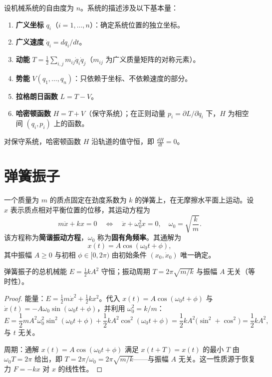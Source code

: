 \begin{definition}[机械系统的基本量]\label{def:mechanical_quantities}
设机械系统的自由度为 $n$。系统的描述涉及以下基本量：
\begin{enumerate}[label=(\roman*)]
    \item \textbf{广义坐标} $q_i$（$i = 1, \dots, n$）：确定系统位置的独立坐标。
    \item \textbf{广义速度} $\dot{q}_i = dq_i/dt$。
    \item \textbf{动能} $T = \frac{1}{2}\sum_{i,j} m_{ij}\dot{q}_i\dot{q}_j$（$m_{ij}$ 为广义质量矩阵的对称元素）。
    \item \textbf{势能} $V(q_1, \dots, q_n)$：只依赖于坐标、不依赖速度的部分。
    \item \textbf{拉格朗日函数} $L = T - V$。
    \item \textbf{哈密顿函数} $H = T + V$（保守系统）；在正则动量 $p_i = \partial L/\partial\dot{q}_i$ 下，$H$ 为相空间 $(q_i, p_i)$ 上的函数。
\end{enumerate}
对保守系统，哈密顿函数 $H$ 沿轨道的值守恒，即 $\frac{dH}{dt} = 0$。
\end{definition}

\section{弹簧振子}

\begin{definition}[弹簧振子]\label{def:spring_oscillator}
一个质量为 $m$ 的质点固定在劲度系数为 $k$ 的弹簧上，在无摩擦水平面上运动。设 $x$ 表示质点相对平衡位置的位移，其运动方程为
\[
m\ddot{x} + kx = 0 \quad \Longleftrightarrow \quad \ddot{x} + \omega_0^2 x = 0, \quad \omega_0 = \sqrt{\frac{k}{m}}.
\]
该方程称为\textbf{简谐振动方程}，$\omega_0$ 称为\textbf{固有角频率}。其通解为
\[
x(t) = A\cos(\omega_0 t + \phi),
\]
其中振幅 $A \ge 0$ 与初相 $\phi \in [0, 2\pi)$ 由初始条件 $(x_0, \dot{x}_0)$ 唯一确定。
\end{definition}

\begin{proposition}[弹簧振子的能量守恒与等时性]\label{prop:spring_energy_period}
弹簧振子的总机械能 $E = \frac{1}{2}kA^2$ 守恒；振动周期 $T = 2\pi\sqrt{m/k}$ 与振幅 $A$ 无关（等时性）。
\end{proposition}

\begin{proof}
能量：$E = \frac{1}{2}m\dot x^2 + \frac{1}{2}kx^2$。代入 $x(t) = A\cos(\omega_0 t + \phi)$ 与 $\dot x(t) = -A\omega_0\sin(\omega_0 t + \phi)$，并利用 $\omega_0^2 = k/m$：
\[
E = \frac{1}{2}mA^2\omega_0^2\sin^2(\omega_0 t+\phi) + \frac{1}{2}kA^2\cos^2(\omega_0 t+\phi) = \frac{1}{2}kA^2\big(\sin^2 + \cos^2\big) = \frac{1}{2}kA^2,
\]
与 $t$ 无关。

周期：通解 $x(t) = A\cos(\omega_0 t + \phi)$ 满足 $x(t+T) = x(t)$ 的最小 $T$ 由 $\omega_0 T = 2\pi$ 给出，即 $T = 2\pi/\omega_0 = 2\pi\sqrt{m/k}$——与振幅 $A$ 无关。这一性质源于恢复力 $F = -kx$ 对 $x$ 的线性性。
\end{proof}

